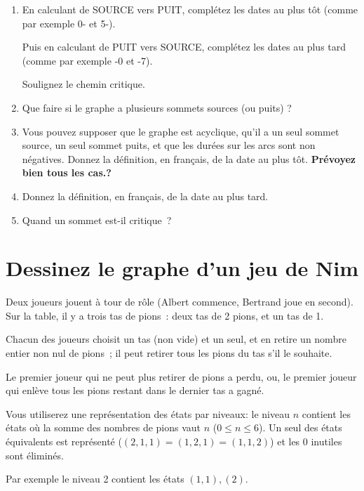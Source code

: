 \documentclass[11pt]{article}
\begin{document}
\begin{enumerate}

\item 
En calculant de SOURCE vers PUIT, complétez les dates au plus tôt (comme par exemple 0- et 5-).


Puis en calculant de  PUIT vers SOURCE, complétez les dates au plus tard (comme par exemple -0 et -7).

Soulignez le chemin critique.


\item Que faire si le graphe a plusieurs sommets sources (ou puits) ?

\item  Vous pouvez supposer que le graphe est acyclique, qu'il a un seul sommet source, un seul sommet puits, et que les durées sur les arcs sont non négatives.
Donnez la définition, en français, de la date au plus tôt. 
\textbf{Prévoyez bien tous les cas.?}

\item   Donnez la définition, en français, de la date au plus tard.

\item   Quand un sommet est-il critique~?

\end{enumerate}

\section{Dessinez le graphe d'un jeu de Nim}
Deux joueurs jouent à tour de rôle (Albert commence, Bertrand joue en second). Sur la table, il y a trois tas de pions~:
deux tas de 2 pions, et un tas de 1.

\smallskip
Chacun des joueurs choisit un tas (non vide) et  un seul,
et en retire un nombre entier  non nul  de pions~; il peut retirer  tous les pions du tas s'il le souhaite.

\smallskip
Le premier joueur qui ne peut plus retirer de pions
a perdu, ou, le premier joueur qui enlève tous les pions restant dans le dernier tas a gagné. 

\medskip
Vous utiliserez une représentation des états par niveaux: le niveau $n$ contient les états où la somme des nombres de pions vaut $n$ ($0 \le n \le 6 $). Un seul des états équivalents est représenté ($(2, 1, 1)=(1, 2, 1)=(1, 1, 2)$) et les $0$ inutiles sont éliminés.

Par exemple le niveau 2 contient
les états $(1, 1), (2)$. 
\end{document}
